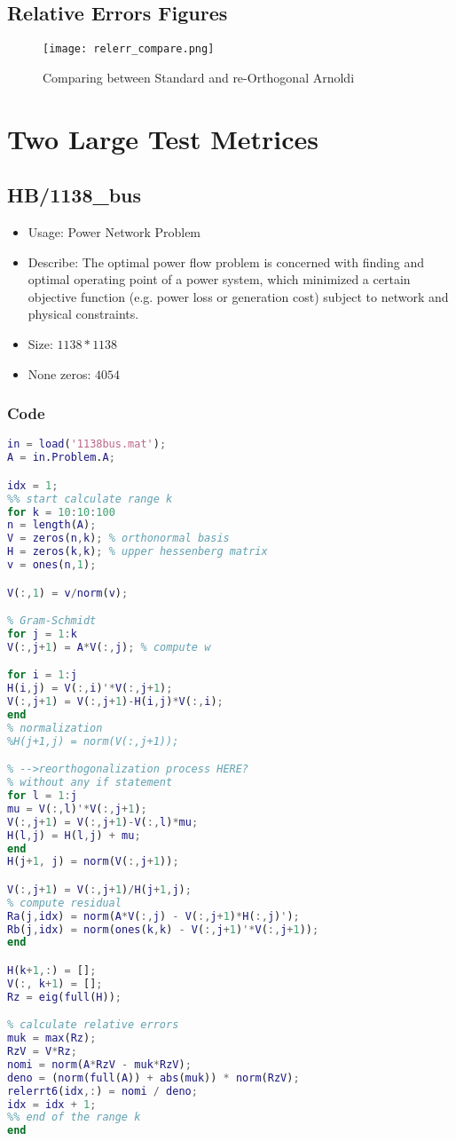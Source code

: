 \documentclass{article}
\begin{document}
\subsection{Relative Errors Figures}
\begin{figure}[H]
    \centering
    \texttt{[image: relerr\_compare.png]}
    \caption{Comparing between Standard and re-Orthogonal Arnoldi}
    \label{fig:relerr}
\end{figure}
\section{Two Large Test Metrices}
\subsection{HB/1138\_bus}
\begin{flushleft}
\begin{itemize}
    \item Usage: Power Network Problem
    \item Describe: The optimal power flow problem is concerned with finding and optimal operating point of a power system, which minimized a certain objective function (e.g. power loss or generation cost) subject to network and physical constraints.
    \item Size: $1138*1138$
    \item None zeros: $4054$
\end{itemize}
\end{flushleft}
\subsubsection{Code}
\begin{lstlisting}[language=Matlab, caption=hb1138.m]
in = load('1138bus.mat');
A = in.Problem.A;

idx = 1;
%% start calculate range k
for k = 10:10:100
n = length(A);
V = zeros(n,k); % orthonormal basis
H = zeros(k,k); % upper hessenberg matrix
v = ones(n,1);

V(:,1) = v/norm(v);

% Gram-Schmidt
for j = 1:k
V(:,j+1) = A*V(:,j); % compute w

for i = 1:j
H(i,j) = V(:,i)'*V(:,j+1);
V(:,j+1) = V(:,j+1)-H(i,j)*V(:,i);
end
% normalization
%H(j+1,j) = norm(V(:,j+1));

% -->reorthogonalization process HERE?
% without any if statement
for l = 1:j
mu = V(:,l)'*V(:,j+1);
V(:,j+1) = V(:,j+1)-V(:,l)*mu;
H(l,j) = H(l,j) + mu;
end
H(j+1, j) = norm(V(:,j+1));

V(:,j+1) = V(:,j+1)/H(j+1,j);
% compute residual
Ra(j,idx) = norm(A*V(:,j) - V(:,j+1)*H(:,j)');
Rb(j,idx) = norm(ones(k,k) - V(:,j+1)'*V(:,j+1));
end

H(k+1,:) = [];
V(:, k+1) = [];
Rz = eig(full(H));

% calculate relative errors
muk = max(Rz);
RzV = V*Rz;
nomi = norm(A*RzV - muk*RzV);
deno = (norm(full(A)) + abs(muk)) * norm(RzV);
relerrt6(idx,:) = nomi / deno;
idx = idx + 1;
%% end of the range k
end
\end{lstlisting}
\end{document}

